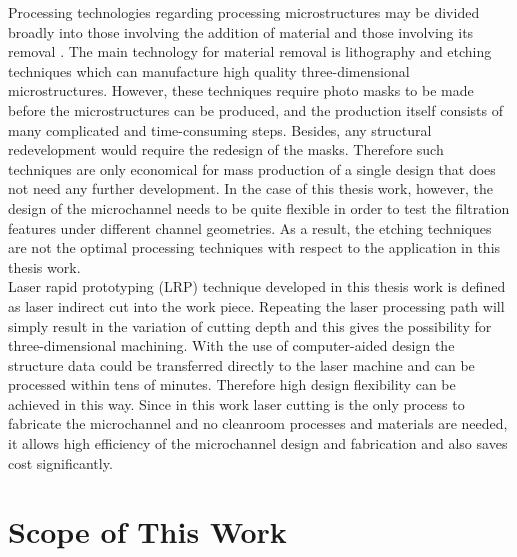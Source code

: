 Processing technologies regarding processing microstructures may be divided broadly into those involving the addition of material and those involving its removal \cite{lehmann1995laser}. The main technology for material removal is lithography and etching techniques which can manufacture high quality three-dimensional microstructures. However, these techniques require photo masks to be made before the microstructures can be produced, and the production itself consists of many complicated and time-consuming steps. Besides, any structural redevelopment would require the redesign of the masks. Therefore such techniques are only economical for mass production of a single design that does not need any further development. In the case of this thesis work, however, the design of the microchannel needs to be quite flexible in order to test the filtration features under different channel geometries. As a result, the etching techniques are not the optimal processing techniques with respect to the application in this thesis work.\\

Laser rapid prototyping (LRP) technique developed in this thesis work is defined as laser indirect cut into the work piece. Repeating the laser processing path will simply result in the variation of cutting depth and this gives the possibility for three-dimensional machining. With the use of computer-aided design the structure data could be transferred directly to the laser machine and can be processed within tens of minutes. Therefore high design flexibility can be achieved in this way. Since in this work laser cutting is the only process to fabricate the microchannel and no cleanroom processes and materials are needed, it allows high efficiency of the microchannel design and fabrication and also saves cost significantly. 


\section{Scope of This Work}
\label{1_2}
